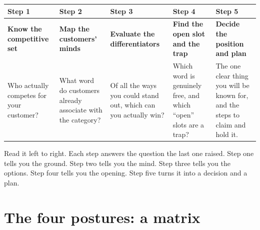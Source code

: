 \documentclass[10pt,twoside,openany]{memoir}
\newcommand{\needspacehead}{\needspace{4\baselineskip}}
\let\oldsection\section
\renewcommand{\section}{\needspacehead\oldsection}
\renewcommand{\arraystretch}{1.1}
\begin{document}
{{{\def\LTcaptype{none} %
{\renewcommand{\arraystretch}{0.9}\begin{longtable}[]{@{}
  >{\raggedright\arraybackslash}p{}
  >{\raggedright\arraybackslash}p{}
  >{\raggedright\arraybackslash}p{}
  >{\raggedright\arraybackslash}p{}
  >{\raggedright\arraybackslash}p{}@{}}
\toprule\noalign{}
\begin{minipage}[b]{\linewidth}\raggedright
Step 1
\end{minipage} & \begin{minipage}[b]{\linewidth}\raggedright
Step 2
\end{minipage} & \begin{minipage}[b]{\linewidth}\raggedright
Step 3
\end{minipage} & \begin{minipage}[b]{\linewidth}\raggedright
Step 4
\end{minipage} & \begin{minipage}[b]{\linewidth}\raggedright
Step 5
\end{minipage} \\
\midrule\noalign{}
\endhead
\bottomrule\noalign{}
\endlastfoot
\textbf{Know the competitive set} & \textbf{Map the customers' minds} &
\textbf{Evaluate the differentiators} & \textbf{Find the open slot and
the trap} & \textbf{Decide the position and plan} \\
Who actually competes for your customer? & What word do customers
already associate with the category? & Of all the ways you could stand
out, which can you actually win? & Which word is genuinely free, and
which ``open'' slots are a trap? & The one clear thing you will be known
for, and the steps to claim and hold it. \\
\end{longtable}
}

Read it left to right. Each step answers the question the last one
raised. Step one tells you the ground. Step two tells you the mind. Step
three tells you the options. Step four tells you the opening. Step five
turns it into a decision and a plan.

\section{The four postures: a matrix}\label{the-four-postures-a-matrix}

}}}
\end{document}

